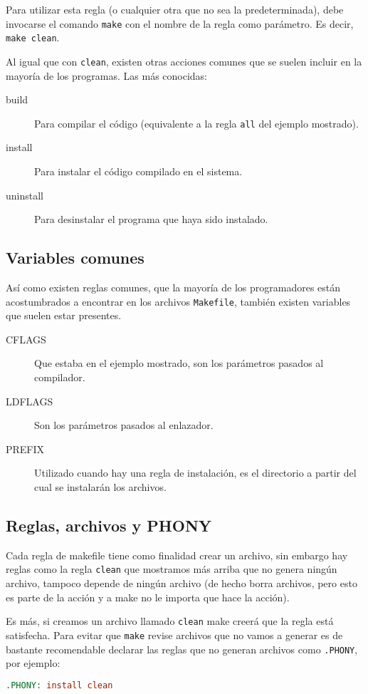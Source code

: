 Para utilizar esta regla (o cualquier otra que no sea la predeterminada), debe
invocarse el comando \verb!make! con el nombre de la regla como parámetro. Es
decir, \verb!make clean!.

Al igual que con \lstinline!clean!, existen otras acciones comunes que se
suelen incluir en la mayoría de los programas.  Las más conocidas:

\begin{description}
\item[build] Para compilar el código (equivalente a la regla
\lstinline!all! del ejemplo mostrado).
\item[install] Para instalar el código compilado en el sistema.
\item[uninstall] Para desinstalar el programa que haya sido
instalado.
\end{description}

\subsection{Variables comunes}

Así como existen reglas comunes, que la mayoría de los programadores están
acostumbrados a encontrar en los archivos \verb!Makefile!, también existen
variables que suelen estar presentes.

\begin{description}
\item[CFLAGS] Que estaba en el ejemplo mostrado, son los
parámetros pasados al compilador.
\item[LDFLAGS] Son los parámetros pasados al enlazador.
\item[PREFIX] Utilizado cuando hay una regla de instalación, es el
directorio a partir del cual se instalarán los archivos.
\end{description}

\subsection{Reglas, archivos y PHONY}

Cada regla de makefile tiene como finalidad crear un archivo, sin embargo hay
reglas como la regla \verb!clean! que mostramos más arriba que no genera
ningún archivo, tampoco depende de ningún archivo (de hecho borra archivos,
pero esto es parte de la acción y a make no le importa que hace la acción).

Es más, si creamos un archivo llamado \verb!clean! make creerá que la regla
está satisfecha. Para evitar que \verb!make! revise archivos que no vamos a
generar es de bastante recomendable declarar las reglas que no generan
archivos como \verb!.PHONY!, por ejemplo:

\begin{lstlisting}[language=make, numbers=none]
.PHONY: install clean
\end{lstlisting}

